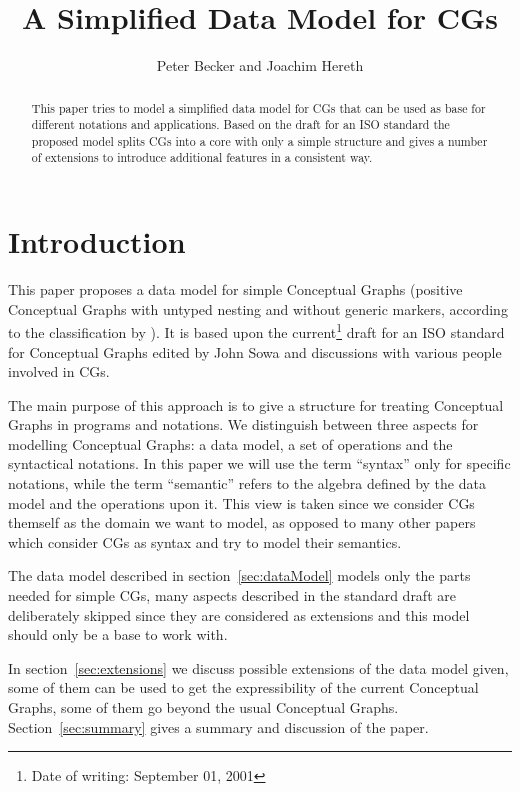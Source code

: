 \documentclass{article}
\title{A Simplified Data Model for CGs}
\author{Peter Becker and Joachim Hereth}
\begin{document}
\maketitle

\begin{abstract}
This paper tries to model a simplified data model for CGs that can be
used as base for different notations and applications. Based on the
draft for an ISO standard the proposed model splits CGs into a core
with only a simple structure and gives a number of extensions to
introduce additional features in a consistent way.
\end{abstract}

\section{Introduction}

This paper proposes a data model for simple Conceptual Graphs (positive
Conceptual Graphs with untyped nesting and without generic markers,
according to the classification by \cite{CM97}). It is
based upon the current\footnote{Date of writing: September 01, 2001} draft for
an ISO standard for Conceptual Graphs edited by John Sowa \cite{standard}
and discussions with various people involved in CGs.

The main purpose of this approach is to give a structure for treating
Conceptual Graphs in programs and notations. We distinguish between
three aspects for modelling Conceptual Graphs: a data model, a set of
operations and the syntactical notations. In this paper we will use
the term ``syntax'' only for specific notations, while the term
``semantic'' refers to the algebra defined by the data model and the
operations upon it. This view is taken since we consider CGs themself
as the domain we want to model, as opposed to many other papers which
consider CGs as syntax and try to model their semantics.

The data model described in section~\ref{sec:dataModel} models only
the parts needed for simple CGs, many aspects described in the
standard draft are deliberately skipped since they are considered as
extensions and this model should only be a base to work with.

In section~\ref{sec:extensions} we discuss possible extensions of the
data model given, some of them can be used to get the expressibility
of the current Conceptual Graphs, some of them go beyond the usual
Conceptual Graphs. Section~\ref{sec:summary} gives a summary and
discussion of the paper.
\end{document}
